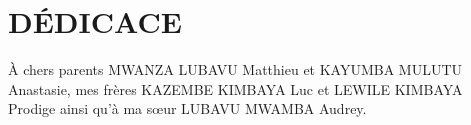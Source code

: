 \chapter*{DÉDICACE}
\centering
À chers parents MWANZA LUBAVU Matthieu et KAYUMBA MULUTU Anastasie, mes frères KAZEMBE KIMBAYA Luc et LEWILE KIMBAYA Prodige ainsi qu'à ma sœur LUBAVU MWAMBA Audrey.